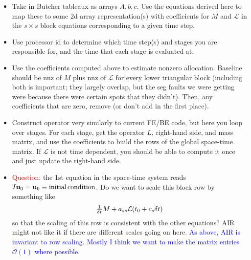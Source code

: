 \documentclass[a4paper,10pt]{article}
\newcommand{\tcb}{\textcolor{blue}}
\begin{document}
\begin{itemize}
\item Take in Butcher tableaux as arrays $A,b,c$. Use the equations derived here to map these to some 2d array
representation(s) with coefficients for $M$ and $\mathcal{L}$ in the $s \times s$ block equations corresponding to
a given time step.

\item Use processor id to determine which time step(s) and stages you are responsible for, and the time that each
stage is evaluated at.

\item Use the coefficients computed above to estimate nonzero allocation. Baseline should be nnz of $M$ plus
nnz of $\mathcal{L}$ for every lower triangular block (including both is important; they largely overlap, but the
seg faults we were getting were because there were certain spots that they didn't). Then, any coefficients that
are zero, remove (or don't add in the first place).

\item Construct operator very similarly to current FE/BE code, but here you loop over stages. For each stage, get
the operator $L$, right-hand side, and mass matrix, and use the coefficients to build the rows of the global space-time
matrix. If $\mathcal{L}$ is not time dependent, you should be able to compute it once and just update the right-hand
side.

\item \textcolor{red}{Question:} the 1st equation in the space-time system reads $I \mathbf{u}_0 = \mathbf{u}_0 \equiv {\rm initial\, condition}$. Do we want to scale this block row by something like 
\[
\tfrac{1}{\delta t} M + a_{ss} {\cal L}(t_0 + c_s \delta t) 
\]
so that the scaling of this row is consistent with the other equations? AIR might not like it if there are different scales going on here.
\tcb{As above, AIR is invariant to row scaling. Mostly I think we want to make the matrix entries $\mathcal{O}(1)$ where possible.}

\end{itemize}
\end{document}
